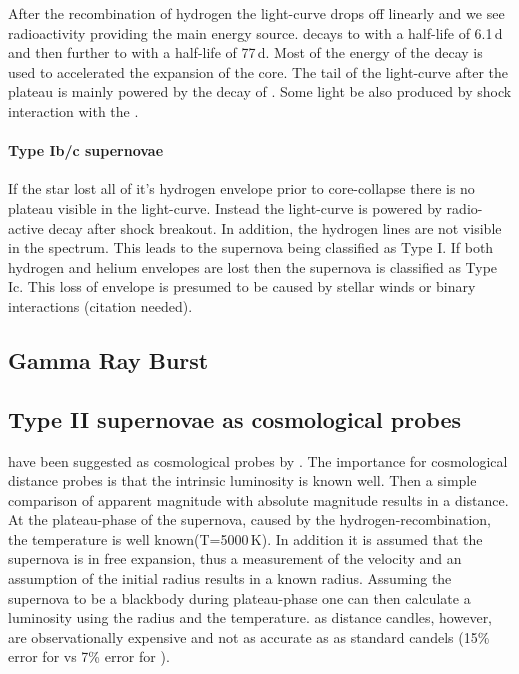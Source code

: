 After the recombination of hydrogen the light-curve drops off linearly and we see radioactivity providing the main energy source. \Ni decays to \cofiftysix with a half-life of 6.1\,d and then further to \fefiftysix with a half-life of 77\,d. Most of the energy of the \Ni decay is used to accelerated the expansion of the core. The tail of the light-curve after the plateau is mainly powered by the decay of \cofiftysix. Some light be also produced by shock interaction with the \csm.

\paragraph{Type Ib/c supernovae}
If the star lost all of it's hydrogen envelope prior to core-collapse there is no plateau visible in the light-curve. Instead the light-curve is powered by radio-active decay after shock breakout. In addition, the hydrogen lines are not visible in the spectrum. This leads to the supernova being classified as Type I. If both hydrogen and helium envelopes are lost then the supernova is classified as Type Ic. 
This loss of envelope is presumed to be caused by stellar winds or binary interactions (citation needed). 

\subsection{Gamma Ray Burst}

\subsection{Type II supernovae as cosmological probes}
\sniip have been suggested as cosmological probes by \citet{1974ApJ...193...27K}. The importance for cosmological distance probes is that the intrinsic luminosity is known well. Then a simple comparison of apparent magnitude with absolute magnitude results in a distance. At the plateau-phase of the supernova, caused by the hydrogen-recombination,  the temperature is well known(T=5000\,K). In addition it is assumed that the supernova is in free expansion, thus a measurement of the velocity and an assumption of the initial radius results in a known radius. Assuming the supernova to be a blackbody during plateau-phase one can then calculate a luminosity using the radius and the temperature. \sniip as distance candles, however, are observationally expensive and not as accurate as \snia as standard candels (15\% error for \snii  \citep{2006ApJ...645..841N} vs 7\% error for \snia).




